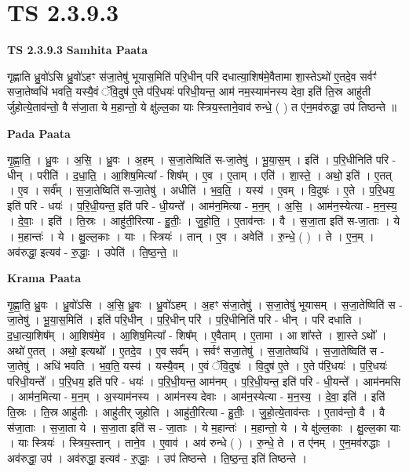\documentclass[17pt]{extarticle}
\begin{document}
\section*{ TS 2.3.9.3 }

\textbf{TS 2.3.9.3 } \newline
\textbf{Samhita Paata} \newline

गृह्णाति ध्रु॒वो॑ऽसि ध्रु॒वो॑ऽहꣳ स॑जा॒तेषु॑ भूयास॒मिति॑ परि॒धीन् परि॑ दधात्या॒शिष॑मे॒वैतामा शा॒स्तेऽथो॑ ए॒तदे॒व सर्वꣳ॑ सजा॒तेष्वधि॑ भवति॒ यस्यै॒वं ॅवि॒दुष॑ ए॒ते प॑रि॒धयः॑ परिधी॒यन्त॒ आम॑ नम॒स्याम॑नस्य देवा॒ इति॑ ति॒स्र आहु॑ती र्जुहोत्ये॒ताव॑न्तो॒ वै स॑जा॒ता ये म॒हान्तो॒ ये क्षु॑ल्ल॒का याः स्त्रिय॒स्ताने॒वाव॑ रुन्धे॒ ( ) त ए॑न॒मव॑रुद्धा॒ उप॑ तिष्ठन्ते ॥ \newline

\textbf{Pada Paata} \newline

गृ॒ह्णा॒ति॒ । ध्रु॒वः । अ॒सि॒ । ध्रु॒वः । अ॒हम् । स॒जा॒तेष्विति॑ स-जा॒तेषु॑ । भू॒या॒स॒म् । इति॑ । प॒रि॒धीनिति॑ परि - धीन् । परीति॑ । द॒धा॒ति॒ । आ॒शिष॒मित्या᳚ - शिष᳚म् । ए॒व । ए॒ताम् । एति॑ । शा॒स्ते॒ । अथो॒ इति॑ । ए॒तत् । ए॒व । सर्व᳚म् । स॒जा॒तेष्विति॑ स-जा॒तेषु॑ । अधीति॑ । भ॒व॒ति॒ । यस्य॑ । ए॒वम् । वि॒दुषः॑ । ए॒ते । प॒रि॒धय॒ इति॑ परि - धयः॑ । प॒रि॒धी॒यन्त॒ इति॑ परि - धी॒यन्ते᳚ । आम॑न॒मित्या - म॒न॒म् । अ॒सि॒ । आम॑न॒स्येत्या - म॒न॒स्य॒ । दे॒वाः॒ । इति॑ । ति॒स्रः । आहु॑ती॒रित्या - हु॒तीः॒ । जु॒हो॒ति॒ । ए॒ताव॑न्तः । वै । स॒जा॒ता इति॑ स-जा॒ताः । ये । म॒हान्तः॑ । ये । क्षु॒ल्ल॒काः । याः । स्त्रियः॑ । तान् ।  ए॒व । अवेति॑ । रु॒न्धे॒ ( ) । ते । ए॒न॒म् । अव॑रुद्धा॒ इत्यव॑ - रु॒द्धाः॒ । उपेति॑ । ति॒ष्ठ॒न्ते॒ ॥  \newline


\textbf{Krama Paata} \newline

गृ॒ह्णा॒ति॒ ध्रु॒वः । ध्रु॒वो॑ऽसि । अ॒सि॒ ध्रु॒वः । ध्रु॒वो॑ऽहम् । अ॒हꣳ स॑जा॒तेषु॑ । स॒जा॒तेषु॑ भूयासम् । स॒जा॒तेष्विति॑ स - जा॒तेषु॑ । भू॒या॒स॒मिति॑ । इति॑ परि॒धीन् । प॒रि॒धीन् परि॑ । प॒रि॒धीनिति॑ परि - धीन् । परि॑ दधाति । द॒धा॒त्या॒शिष᳚म् । आ॒शिष॑मे॒व । आ॒शिष॒मित्या᳚ - शिष᳚म् । ए॒वैताम् । ए॒तामा । आ शा᳚स्ते । शा॒स्ते ऽथो᳚ । अथो॑ ए॒तत् । अथो॒ इत्यथो᳚ । ए॒तदे॒व । ए॒व सर्व᳚म् । सर्वꣳ॑ सजा॒तेषु॑ । स॒जा॒तेष्वधि॑ । स॒जा॒तेष्विति॑ स - जा॒तेषु॑ । अधि॑ भवति । भ॒व॒ति॒ यस्य॑ । यस्यै॒वम् । ए॒वं ॅवि॒दुषः॑ । वि॒दुष॑ ए॒ते । ए॒ते प॑रि॒धयः॑ । प॒रि॒धयः॑ परिधी॒यन्ते᳚ । प॒रि॒धय॒ इति॑ परि - धयः॑ । प॒रि॒धी॒यन्त॒ आम॑नम् । प॒रि॒धी॒यन्त॒ इति॑ परि - धी॒यन्ते᳚ । आम॑नमसि । आम॑न॒मित्या - म॒न॒म् । अ॒स्याम॑नस्य । आम॑नस्य देवाः । आम॑न॒स्येत्या - म॒न॒स्य॒ । दे॒वा॒ इति॑ । इति॑ ति॒स्रः । ति॒स्र आहु॑तीः । आहु॑तीर् जुहोति । आहु॑ती॒रित्या - हु॒तीः॒ । जु॒हो॒त्ये॒ताव॑न्तः । ए॒ताव॑न्तो॒ वै । वै स॑जा॒ताः । स॒जा॒ता ये । स॒जा॒ता इति॑ स - जा॒ताः । ये म॒हान्तः॑ । म॒हान्तो॒ ये । ये क्षु॑ल्ल॒काः । क्षु॒ल्ल॒का याः । याः स्त्रियः॑ । स्त्रिय॒स्तान् । ताने॒व । ए॒वाव॑ । अव॑ रुन्धे ( ) । रु॒न्धे॒ ते । त ए॑नम् । ए॒न॒मव॑रुद्धाः । अव॑रुद्धा॒ उप॑ । अव॑रुद्धा॒ इत्यव॑ - रु॒द्धाः॒ । उप॑ तिष्ठन्ते । ति॒ष्ठ॒न्त॒ इति॑ तिष्ठन्ते । \newline
\end{document}
